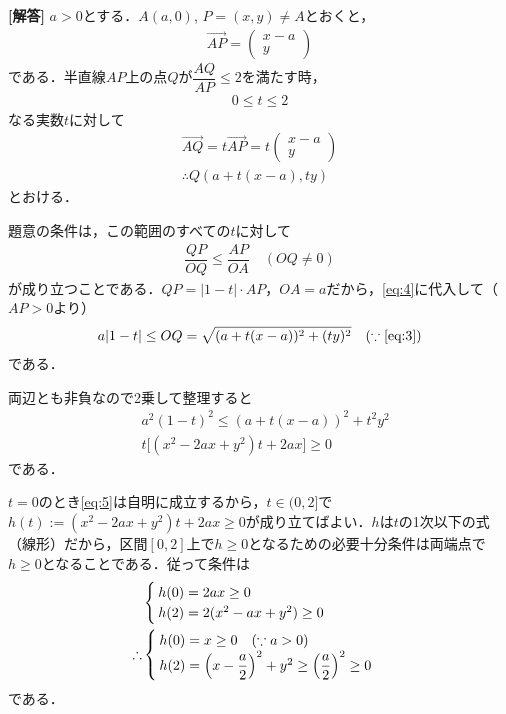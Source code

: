 \documentclass[../../main.tex]{subfiles}
\begin{document}
\begin{oframed}
  
\end{oframed}

{\bf [解答]}
$a>0$とする．$A(a,0)$, $P=(x,y)\neq A$とおくと，
\begin{align}
  \overrightarrow{AP}=
  \begin{pmatrix}
    x-a \\ y
  \end{pmatrix} \label{eq:1}
\end{align}
である．半直線$AP$上の点$Q$が$\dfrac{AQ}{AP}\le 2$を満たす時，
\begin{align}
  0 \le t \le 2 \label{eq:2}
\end{align}
なる実数$t$に対して
\begin{align}
  \overrightarrow{AQ} = t \overrightarrow{AP} =
  t
  \begin{pmatrix}
    x-a \\ y
  \end{pmatrix} \\
  \therefore
  Q(a+t(x-a),ty) \label{eq:3}
\end{align}
とおける．

題意の条件は，この範囲のすべての$t$に対して
\begin{align}
  \dfrac{QP}{OQ}\le\dfrac{AP}{OA}\quad(OQ\neq 0) \label{eq:4}
\end{align}
が成り立つことである．$QP=|1-t|\cdot AP$，$OA=a$だから，\cref{eq:4}に代入して（$AP>0$より）
\begin{align}
  a|1-t|\le OQ=\sqrt{(a+t(x-a))^2+(ty)^2} \quad (\because \text{\cref{eq:3}})
\end{align}
である．

両辺とも非負なので2乗して整理すると
\begin{align}
  & a^2(1-t)^2\le(a+t(x-a))^2+t^2y^2 \\
  & t\bigl[(x^2-2ax+y^2)t+2ax\bigr]\ge 0 \label{eq:5}
\end{align}
である．

$t=0$のとき\cref{eq:5}は自明に成立するから，$t\in(0,2]$で$h(t):=(x^2-2ax+y^2)t+2ax\ge0$が成り立てばよい．$h$は$t$の1次以下の式（線形）だから，区間$[0,2]$上で$h\ge0$となるための必要十分条件は両端点で$h\ge0$となることである．従って条件は
\begin{align}
  &
  \begin{cases}
    h(0)=2ax\ge 0 \\
    h(2)=2(x^2-ax+y^2)\ge 0
  \end{cases} \\
  \therefore
  &
  \begin{cases}
    h(0)=x\ge 0 \quad (\because a>0)\\
    h(2)=\Bigl(x-\dfrac{a}{2}\Bigr)^2+y^2\ge \Bigl(\dfrac{a}{2}\Bigr)^2 \ge 0
  \end{cases} \label{eq:6}
\end{align}
である．
\end{document}
